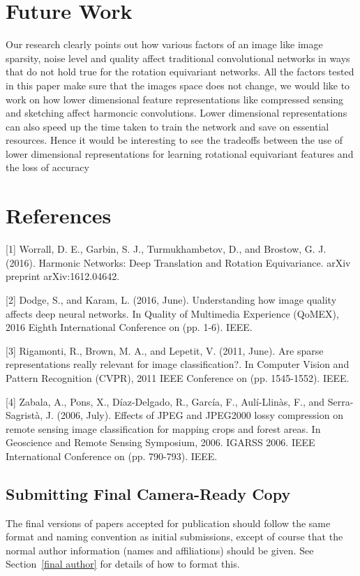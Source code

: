 \documentclass{article}
\begin{document}
\section{Future Work}
Our research clearly points out how various factors of an image like image sparsity, noise level and quality affect traditional convolutional networks in ways that do not hold true for the rotation equivariant networks. All the factors tested in this paper make sure that the images space does not change, we would like to work on how lower dimensional feature representations like compressed sensing and sketching affect harmoncic convolutions. Lower dimensional representations can also speed up the time taken to train the network and save on essential resources. Hence it would be interesting to see the tradeoffs between the use of lower dimensional representations for learning rotational equivariant features and the loss of accuracy

\section{References}
[1] Worrall, D. E., Garbin, S. J., Turmukhambetov, D., and Brostow, G. J. (2016). Harmonic Networks: Deep Translation and Rotation Equivariance. arXiv preprint arXiv:1612.04642.

[2] Dodge, S., and Karam, L. (2016, June). Understanding how image quality affects deep neural networks. In Quality of Multimedia Experience (QoMEX), 2016 Eighth International Conference on (pp. 1-6). IEEE.

[3] Rigamonti, R., Brown, M. A., and Lepetit, V. (2011, June). Are sparse representations really relevant for image classification?. In Computer Vision and Pattern Recognition (CVPR), 2011 IEEE Conference on (pp. 1545-1552). IEEE.

[4] Zabala, A., Pons, X., Díaz-Delgado, R., García, F., Aulí-Llinàs, F., and Serra-Sagristà, J. (2006, July). Effects of JPEG and JPEG2000 lossy compression on remote sensing image classification for mapping crops and forest areas. In Geoscience and Remote Sensing Symposium, 2006. IGARSS 2006. IEEE International Conference on (pp. 790-793). IEEE.




\subsection{Submitting Final Camera-Ready Copy}

The final versions of papers accepted for publication should follow the
same format and naming convention as initial submissions, except of
course that the normal author information (names and affiliations)
should be given.  See Section~\ref{final author} for details of how to
format this.
\end{document}
